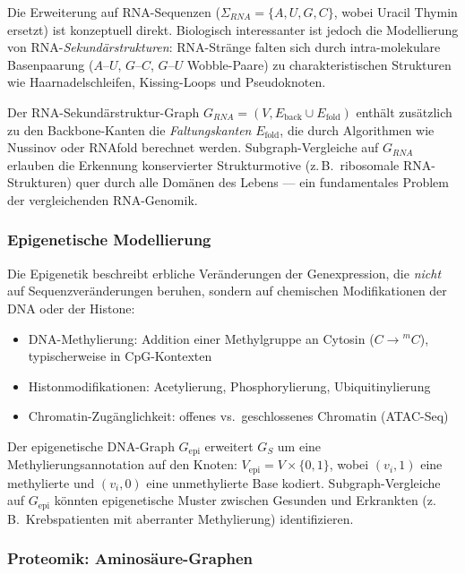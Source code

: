 ﻿\documentclass[a4paper,12pt]{article}
\theoremstyle{definition}
\begin{document}
Die Erweiterung auf RNA-Sequenzen ($\Sigma_{RNA} = \{A, U, G, C\}$,
wobei Uracil Thymin ersetzt) ist konzeptuell direkt. Biologisch interessanter
ist jedoch die Modellierung von RNA-\textit{Sekundärstrukturen}: RNA-Stränge
falten sich durch intra-molekulare Basenpaarung ($A$--$U$, $G$--$C$, $G$--$U$
Wobble-Paare) zu charakteristischen Strukturen wie Haarnadelschleifen,
Kissing-Loops und Pseudoknoten.

Der RNA-Sekundärstruktur-Graph $G_{RNA} = (V, E_{\text{back}} \cup E_{\text{fold}})$
enthält zusätzlich zu den Backbone-Kanten die \textit{Faltungskanten}
$E_{\text{fold}}$, die durch Algorithmen wie Nussinov oder RNAfold berechnet werden.
Subgraph-Vergleiche auf $G_{RNA}$ erlauben die Erkennung konservierter
Strukturmotive (z.\,B.\ ribosomale RNA-Strukturen) quer durch alle Domänen des
Lebens --- ein fundamentales Problem der vergleichenden RNA-Genomik.

\subsubsection{Epigenetische Modellierung}

Die Epigenetik beschreibt erbliche Veränderungen der Genexpression, die
\textit{nicht} auf Sequenzveränderungen beruhen, sondern auf chemischen
Modifikationen der DNA oder der Histone:
\begin{itemize}
	\item DNA-Methylierung: Addition einer Methylgruppe an Cytosin
	($C \to {}^m C$), typischerweise in CpG-Kontexten
	\item Histonmodifikationen: Acetylierung, Phosphorylierung, Ubiquitinylierung
	\item Chromatin-Zugänglichkeit: offenes vs.\ geschlossenes Chromatin (ATAC-Seq)
\end{itemize}

Der epigenetische DNA-Graph $G_{\text{epi}}$ erweitert $G_S$ um eine
Methylierungsannotation auf den Knoten: $V_{\text{epi}} = V \times \{0, 1\}$,
wobei $(v_i, 1)$ eine methylierte und $(v_i, 0)$ eine unmethylierte Base
kodiert. Subgraph-Vergleiche auf $G_{\text{epi}}$ könnten epigenetische Muster
zwischen Gesunden und Erkrankten (z.\,B.\ Krebspatienten mit aberranter
Methylierung) identifizieren.

\subsubsection{Proteomik: Aminosäure-Graphen}
\end{document}
